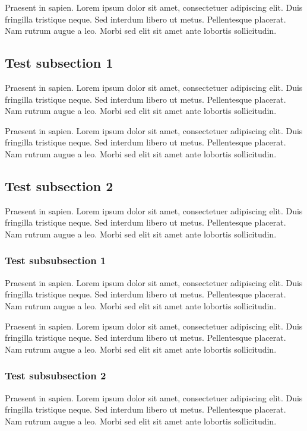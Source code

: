 \documentclass[a5paper,12pt,draft]{book} %
\begin{document}
Praesent in sapien. Lorem ipsum dolor sit amet, consectetuer adipiscing elit.
Duis fringilla tristique neque. Sed interdum libero ut metus. Pellentesque placerat.
Nam rutrum augue a leo. Morbi sed elit sit amet ante lobortis sollicitudin.

\subsection*{Test subsection 1}
Praesent in sapien. Lorem ipsum dolor sit amet, consectetuer adipiscing elit.
Duis fringilla tristique neque. Sed interdum libero ut metus. Pellentesque placerat.
Nam rutrum augue a leo. Morbi sed elit sit amet ante lobortis sollicitudin.

Praesent in sapien. Lorem ipsum dolor sit amet, consectetuer adipiscing elit.
Duis fringilla tristique neque. Sed interdum libero ut metus. Pellentesque placerat.
Nam rutrum augue a leo. Morbi sed elit sit amet ante lobortis sollicitudin.

\subsection*{Test subsection 2}
Praesent in sapien. Lorem ipsum dolor sit amet, consectetuer adipiscing elit.
Duis fringilla tristique neque. Sed interdum libero ut metus. Pellentesque placerat.
Nam rutrum augue a leo. Morbi sed elit sit amet ante lobortis sollicitudin.

\subsubsection*{Test subsubsection 1}
Praesent in sapien. Lorem ipsum dolor sit amet, consectetuer adipiscing elit.
Duis fringilla tristique neque. Sed interdum libero ut metus. Pellentesque placerat.
Nam rutrum augue a leo. Morbi sed elit sit amet ante lobortis sollicitudin.

Praesent in sapien. Lorem ipsum dolor sit amet, consectetuer adipiscing elit.
Duis fringilla tristique neque. Sed interdum libero ut metus. Pellentesque placerat.
Nam rutrum augue a leo. Morbi sed elit sit amet ante lobortis sollicitudin.

\subsubsection*{Test subsubsection 2}
Praesent in sapien. Lorem ipsum dolor sit amet, consectetuer adipiscing elit.
Duis fringilla tristique neque. Sed interdum libero ut metus. Pellentesque placerat.
Nam rutrum augue a leo. Morbi sed elit sit amet ante lobortis sollicitudin.
\end{document}
